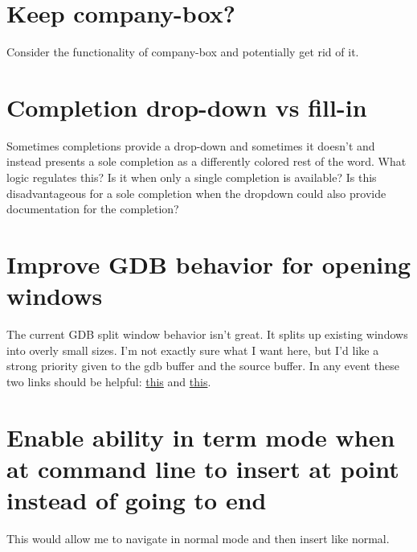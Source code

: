 \documentclass{default}
\begin{document}
\section{Keep company-box?}

Consider the functionality of company-box and potentially get rid of it.

\section{Completion drop-down vs fill-in}

Sometimes completions provide a drop-down and sometimes it doesn't and instead presents a sole
completion as a differently colored rest of the word. What logic regulates this? Is it when only a
single completion is available? Is this disadvantageous for a sole completion when the dropdown
could also provide documentation for the completion?

\section{Improve GDB behavior for opening windows}

The current GDB split window behavior isn't great. It splits up existing windows into overly small
sizes. I'm not exactly sure what I want here, but I'd like a strong priority given to the gdb buffer
and the source buffer. In any event these two links should be helpful:
\href{https://emacs.stackexchange.com/questions/38945/m-x-gdb-dont-create-new-frames}{this} and
\href{https://www.gnu.org/software/emacs/manual/html_node/elisp/Display-Action-Functions.html}{this}.

\section{Enable ability in term mode when at command line to insert at point instead of going to
  end}

This would allow me to navigate in normal mode and then insert like normal.
\end{document}
